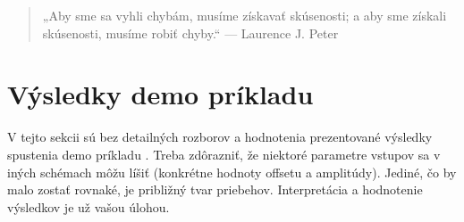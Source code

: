 \documentclass[a4paper, 10pt, ]{article}
\begin{document}
\begin{quote}
„Aby sme sa vyhli chybám, musíme získavať skúsenosti; a aby sme získali skúsenosti, musíme robiť chyby.“  
— Laurence J. Peter
\end{quote}


\section{Výsledky demo príkladu}

\noindent V tejto sekcii sú bez detailných rozborov a hodnotenia prezentované výsledky spustenia demo príkladu . Treba zdôrazniť, že niektoré parametre vstupov sa v iných schémach môžu líšiť (konkrétne hodnoty offsetu a amplitúdy). Jediné, čo by malo zostať rovnaké, je približný tvar priebehov. Interpretácia a hodnotenie výsledkov je už vašou úlohou.  

\begin{center}
\vbox{%
\label{fig_demo_vent}
}%
\end{center}

\begin{center}
\vbox{%
\label{fig_demo_spiral}
}%
\end{center}

\begin{center}
\vbox{%
\label{fig_demo_sensor1}
}%
\end{center}

\begin{center}
\vbox{%
\label{fig_demo_sensor2}
}%
\end{center}


\end{document}
